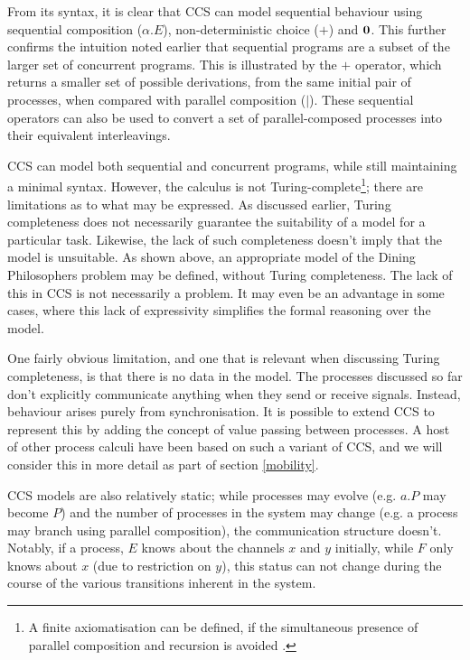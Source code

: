 From its syntax, it is clear that CCS can model sequential behaviour
using sequential composition ($\alpha.E$), non-deterministic choice
($+$) and $\textbf{0}$.  This further confirms the intuition noted earlier that
sequential programs are a subset of the larger set of concurrent
programs.  This is illustrated by the $+$ operator, which
returns a smaller set of possible derivations, from the same initial
pair of processes, when compared with parallel composition ($|$).
These sequential operators can also be used to convert a set of
parallel-composed processes into their equivalent interleavings.

CCS can model both sequential and concurrent programs, while still
maintaining a minimal syntax.  However, the calculus is not
Turing-complete\footnote{A finite axiomatisation can be defined, if
  the simultaneous presence of parallel composition and recursion is
  avoided \cite{milner:ccsaxiom}.}; there are limitations as to what
may be expressed.  As discussed earlier, Turing completeness does not
necessarily guarantee the suitability of a model for a particular
task. Likewise, the lack of such completeness doesn't imply that the
model is unsuitable.  As shown above, an appropriate model of the
Dining Philosophers problem may be defined, without Turing
completeness.  The lack of this in CCS is not necessarily a problem.
It may even be an advantage in some cases, where this lack of
expressivity simplifies the formal reasoning over the model.

One fairly obvious limitation, and one that is relevant when
discussing Turing completeness, is that there is no data in the model.
The processes discussed so far don't explicitly communicate anything
when they send or receive signals.  Instead, behaviour arises purely
from synchronisation.  It is possible to extend CCS to represent this
by adding the concept of value passing between processes.  A host of
other process calculi have been based on such a variant of CCS, and we
will consider this in more detail as part of section \ref{mobility}.

CCS models are also relatively static; while processes may evolve
(e.g. $a.P$ may become $P$) and the number of processes in the system
may change (e.g. a process may branch using parallel composition), the
communication structure doesn't.  Notably, if a process, $E$ knows
about the channels $x$ and $y$ initially, while $F$ only knows about
$x$ (due to restriction on $y$), this status can not change during the
course of the various transitions inherent in the system.

